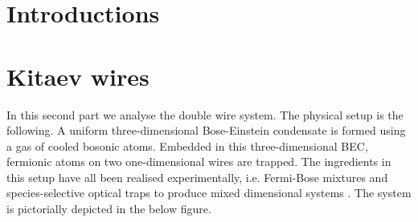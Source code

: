 \documentclass[9pt, twoside]{Thesis}
\begin{document}




\fancyhead[LE,RO]{\thepage}
\tableofcontents %




\mainmatter %

\pagestyle{fancy} %
\fancyhead[LE,RO]{\thepage}



\part{Introductions}
\newpage


 

\part{Kitaev wires}
\fancyhead[LE,RO]{\thepage}
In this second part we analyse the double wire system. The physical setup is the following. A uniform three-dimensional Bose-Einstein condensate is formed using a gas of cooled bosonic atoms. Embedded in this three-dimensional BEC, fermionic atoms on two one-dimensional wires are trapped. The ingredients in this setup have all been realised experimentally, i.e. Fermi-Bose mixtures and species-selective optical traps to produce mixed dimensional systems \cite{Lamporesi.MixedDimensions, McKay.MixedTrapping, Jotzu.SpeciesSelectiveTrap}. The system is pictorially depicted in the below figure.
\end{document}

